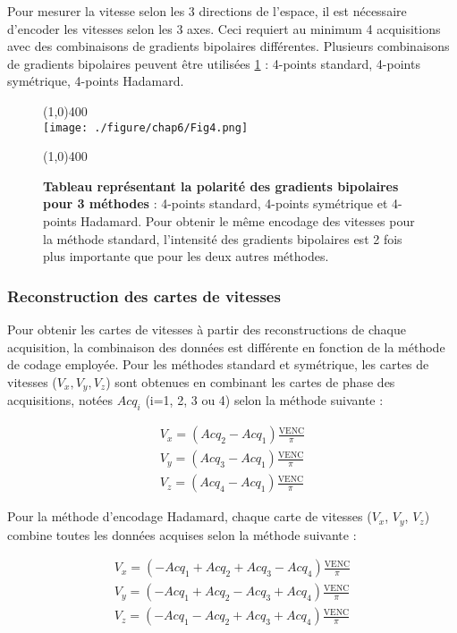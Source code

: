 Pour mesurer la vitesse selon les 3 directions de l'espace, il est nécessaire d'encoder les vitesses selon les 3 axes. Ceci requiert au minimum 4 acquisitions avec des combinaisons de gradients bipolaires différentes. Plusieurs combinaisons de gradients bipolaires peuvent être utilisées \ref{fig:EncFlux} : 4-points standard, 4-points symétrique, 4-points Hadamard. 

\begin{figure}[H]
\centering
\line(1,0){400} \\
\texttt{[image: ./figure/chap6/Fig4.png]}
\caption[Présentation de 3 méthode d'encodage de flux.]{\label{fig:EncFlux} \textbf{Tableau représentant la polarité des gradients bipolaires pour 3 méthodes} : 4-points standard, 4-points symétrique et 4-points Hadamard. Pour obtenir le même encodage des vitesses pour la méthode standard, l'intensité des gradients bipolaires est 2 fois plus importante que pour les deux autres méthodes.}
\line(1,0){400} \\ 
\end{figure}

\subsubsection{Reconstruction des cartes de vitesses}

Pour obtenir les cartes de vitesses à partir des reconstructions de chaque acquisition, la combinaison des données est différente en fonction de la méthode de codage employée. Pour les méthodes standard et symétrique, les cartes de vitesses ($V_x,V_y,V_z$) sont obtenues en combinant les cartes de phase des acquisitions, notées $Acq_i$ (i=1, 2, 3 ou 4) selon la méthode suivante :

\begin{equation}
\begin{split}
V_x = (Acq_2-Acq_1) \frac{\text{VENC}}{\pi} \\
V_y = (Acq_3-Acq_1 ) \frac{\text{VENC}}{\pi}\\
V_z = (Acq_4-Acq_1 ) \frac{\text{VENC}}{\pi}
\end{split}
\end{equation}

Pour la méthode d’encodage Hadamard, chaque carte de vitesses ($V_x$, $V_y$, $V_z$) combine toutes les données acquises selon la méthode suivante : 

\begin{equation}
\begin{split}
V_x = (-Acq_1+Acq_2+Acq_3-Acq_4) \frac{\text{VENC}}{\pi} \\
V_y = (-Acq_1+Acq_2-Acq_3+Acq_4 ) \frac{\text{VENC}}{\pi}\\
V_z = (-Acq_1-Acq_2+Acq_3+Acq_4 ) \frac{\text{VENC}}{\pi}
\end{split}
\end{equation}

